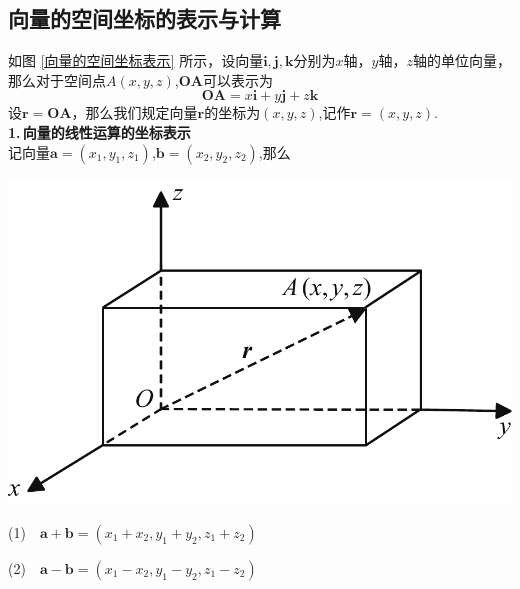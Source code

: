 \subsection{向量的空间坐标的表示与计算}
\vspace*{-0.5em}

\noindent
\begin{minipage}{0.6\linewidth}
\hspace*{2em}如图 \ref{向量的空间坐标表示} 所示，设向量$\boldsymbol{i},\boldsymbol{j},\boldsymbol{k}$分别为$x$轴，$y$轴，$z$轴的单位向量，那么对于空间点$A(x,y,z)$,$\boldsymbol{OA}$可以表示为
\begin{equation}
	\boldsymbol{OA}=x\boldsymbol{i}+y\boldsymbol{j}+z\boldsymbol{k}
\end{equation}
设$\boldsymbol{r}=\boldsymbol{OA}$，那么我们规定向量$\boldsymbol{r}$的坐标为$(x,y,z)$,记作$\boldsymbol{r}=(x,y,z)$.\\[0.5em]
\textbf{1.$\,$向量的线性运算的坐标表示}\\
\hspace*{2em} 记向量$\boldsymbol{a}=(x_1,y_1,z_1)$,$\boldsymbol{b}=(x_2,y_2,z_2)$,那么
\end{minipage}
\begin{minipage}{0.4\linewidth}
	\centering
	\includegraphics[width = 0.9\linewidth]{pic/C-5/veclinar}
	\vspace*{-1em}
	\label{向量的空间坐标表示}
\end{minipage}
\vspace*{-0.5em}

(1)$\quad \boldsymbol{a}+\boldsymbol{b}=(x_1+x_2,y_1+y_2,z_1+z_2)$

(2)$\quad \boldsymbol{a}-\boldsymbol{b}=(x_1-x_2,y_1-y_2,z_1-z_2)$

